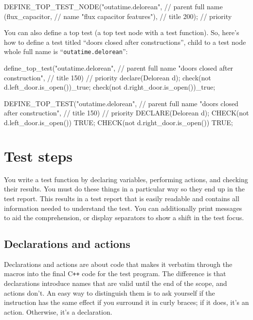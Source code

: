 \documentclass[twoside, a4paper, article]{memoir}
\newcommand*\Cpp{C\texttt{++}}
\begin{document}
\begin{cpplisting}
DEFINE_TOP_TEST_NODE("outatime.delorean", // parent full name
                     (flux_capacitor, // name
                      "flux capacitor features"), // title
                     200); // priority
\end{cpplisting}

You can also define a top test (a top test node with a test function).  So,
here's how to define a test titled ``doors closed after constructions'', child
to a test node whole full name is ``\texttt{outatime.delorean}'':
\begin{cpplisting}
define_top_test("outatime.delorean", // parent full name
                "doors closed after construction", // title
                150) { // priority
  declare(Delorean d);
  check(not d.left_door.is_open())_true;
  check(not d.right_door.is_open())_true;
}
\end{cpplisting}

\begin{cpplisting}
DEFINE_TOP_TEST("outatime.delorean", // parent full name
                "doors closed after construction", // title
                150) // priority
{
  DECLARE(Delorean d);
  CHECK(not d.left_door.is_open()) TRUE;
  CHECK(not d.right_door.is_open()) TRUE;
}
\end{cpplisting}


\chapter{Test steps}
\label{cha:test-steps}

You write a test function by declaring variables, performing actions, and
checking their results.  You must do these things in a particular way so they
end up in the test report.  This results in a test report that is easily
readable and contains all information needed to understand the test.  You can
additionally print messages to aid the comprehension, or display separators to
show a shift in the test focus.

\section{Declarations and actions}
\label{sec:declarations-actions}

Declarations and actions are about code that makes it verbatim through the
macros into the final \Cpp{} code for the test program.  The difference is that
declarations introduce names that are valid until the end of the scope, and
actions don't.  An easy way to distinguish them is to ask yourself if the
instruction has the same effect if you surround it in curly braces; if it does,
it's an action. Otherwise, it's a declaration.
\end{document}
